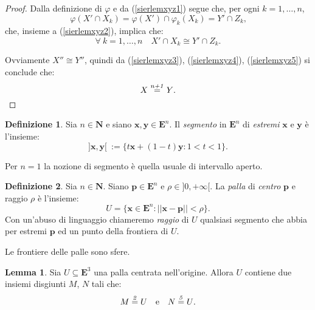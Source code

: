 \documentclass[a4paper,oneside,11pt]{book}
\theoremstyle{definition} \newtheorem{Def}{Definizione}
\theoremstyle{plain} \newtheorem{teo}{Teorema}
\theoremstyle{plain} \newtheorem{cor}[teo]{Corollario}
\theoremstyle{definition} \newtheorem{lem}[teo]{Lemma}
\theoremstyle{plain} \newtheorem{pro}[teo]{Proposizione}
\newcommand{\ug}[1]{(\ref{#1})} %
\newcommand{\eqn}[1]{\stackrel{\text{\textit{#1}}}{=}}
\begin{document}
\begin{proof}
		Dalla definizione di $\varphi$ e da \ug{sierlemxyz1} segue che, per ogni $k = 1, \dots, n$,
		\begin{equation*}
			\varphi(X' \cap X_k) = \varphi(X') \cap \varphi_k(X_k) = Y' \cap Z_k \text{,}
		\end{equation*}
		che, insieme a \ug{sierlemxyz2}, implica che:
		\begin{equation}\label{sierlemxyz5}
			\forall\ k = 1, \dots, n \quad X' \cap X_k \cong Y' \cap Z_k \text{.}
		\end{equation}
		
		Ovviamente $X'' \cong Y''$, quindi da \ug{sierlemxyz3}, \ug{sierlemxyz4}, \ug{sierlemxyz5} si conclude che:
		\begin{equation*}
			X \eqn{n+1} Y \text{.}
		\end{equation*}
	\end{proof}

	\begin{Def}
		Sia $n \in \mathbf{N}$ e siano $\mathbf{x},\mathbf{y} \in \mathbf{E}^n$. Il \emph{segmento} in $\mathbf{E}^n$ di \emph{estremi} $\mathbf{x}$ e $\mathbf{y}$ è l'insieme:
		\begin{equation*}
			]\mathbf{x}, \mathbf{y}[\ := \{t\mathbf{x} + (1-t)\mathbf{y} : 1 < t < 1\} \text{.}
		\end{equation*}
	\end{Def}
	
	Per $n=1$ la nozione di segmento è quella usuale di intervallo aperto.
	
	\begin{Def}
		Sia $n \in \mathbf{N}$. Siano $\mathbf{p} \in \mathbf{E}^n$ e $\rho \in ]0, +\infty[$. La \emph{palla} di \emph{centro} $\mathbf{p}$ e raggio $\rho$ è l'insieme:
		\begin{equation*}
			U = \{\mathbf{x} \in \mathbf{E}^n : ||\mathbf{x}-\mathbf{p}|| < \rho\} \text{.}
		\end{equation*}
		Con un'abuso di linguaggio chiameremo \emph{raggio} di $U$ qualsiasi segmento che abbia per estremi $\mathbf{p}$ ed un punto della frontiera di $U$.  
	\end{Def}
	
	Le frontiere delle palle sono sfere.
	
	\begin{lem}\label{sierlembt} %
		Sia $U\subseteq \mathbf{E}^3$ una palla centrata nell'origine. Allora $U$ contiene due insiemi disgiunti $M$, $N$ tali che:
		\begin{equation*}
			M \eqn{2} U \quad \text{e} \quad N \eqn{5} U \text{.}
		\end{equation*}
	\end{lem}
	
\end{document}
